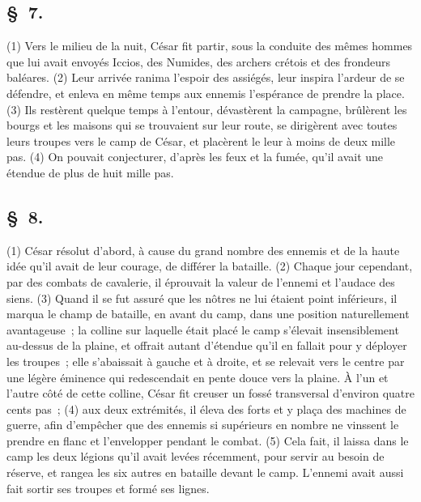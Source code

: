 \documentclass[french,twoside]{book} %
\begin{document}
\subsection[{§ 7.}]{ \textsc{§ 7.} }
\noindent (1) Vers le milieu de la nuit, César fit partir, sous la conduite des mêmes hommes que lui avait envoyés Iccios, des Numides, des archers crétois et des frondeurs baléares. (2) Leur arrivée ranima l’espoir des assiégés, leur inspira l’ardeur de se défendre, et enleva en même temps aux ennemis l’espérance de prendre la place. (3) Ils restèrent quelque temps à l’entour, dévastèrent la campagne, brûlèrent les bourgs et les maisons qui se trouvaient sur leur route, se dirigèrent avec toutes leurs troupes vers le camp de César, et placèrent le leur à moins de deux mille pas. (4) On pouvait conjecturer, d’après les feux et la fumée, qu’il avait une étendue de plus de huit mille pas.
\subsection[{§ 8.}]{ \textsc{§ 8.} }
\noindent (1) César résolut d’abord, à cause du grand nombre des ennemis et de la haute idée qu’il avait de leur courage, de différer la bataille. (2) Chaque jour cependant, par des combats de cavalerie, il éprouvait la valeur de l’ennemi et l’audace des siens. (3) Quand il se fut assuré que les nôtres ne lui étaient point inférieurs, il marqua le champ de bataille, en avant du camp, dans une position naturellement avantageuse ; la colline sur laquelle était placé le camp s’élevait insensiblement au-dessus de la plaine, et offrait autant d’étendue qu’il en fallait pour y déployer les troupes ; elle s’abaissait à gauche et à droite, et se relevait vers le centre par une légère éminence qui redescendait en pente douce vers la plaine. À l’un et l’autre côté de cette colline, César fit creuser un fossé transversal d’environ quatre cents pas ; (4) aux deux extrémités, il éleva des forts et y plaça des machines de guerre, afin d’empêcher que des ennemis si supérieurs en nombre ne vinssent le prendre en flanc et l’envelopper pendant le combat. (5) Cela fait, il laissa dans le camp les deux légions qu’il avait levées récemment, pour servir au besoin de réserve, et rangea les six autres en bataille devant le camp. L'ennemi avait aussi fait sortir ses troupes et formé ses lignes.
\end{document}
